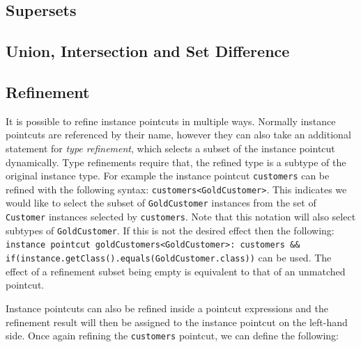 \documentclass{llncs}
\begin{document}
\subsection{Supersets}


\subsection{Union, Intersection and Set Difference}


\subsection{Refinement} 
It is possible to refine instance pointcuts in multiple ways. Normally instance pointcuts are referenced by their name, however they can also take an additional statement for \emph{type refinement}, which selects a subset of the instance pointcut dynamically. Type refinements require that, the refined type is a subtype of the original instance type. For example the instance pointcut \texttt{customers} can be refined with the following syntax: \lstinline!customers<GoldCustomer>!. 
This indicates we would like to select the subset of \texttt{GoldCustomer} instances from the set of \texttt{Customer} instances selected by \texttt{customers}. 
Note that this notation will also select subtypes of \texttt{GoldCustomer}. 
If this is not the desired effect then the following: \lstinline!instance pointcut goldCustomers<GoldCustomer>: customers && if(instance.getClass().equals(GoldCustomer.class))! can be used. 
The effect of a refinement subset being empty is equivalent to that of an unmatched pointcut. 

Instance pointcuts can also be refined inside a pointcut expressions and the refinement result will then be assigned to the instance pointcut on the left-hand side. Once again refining the \texttt{customers} pointcut, we can define the following:
\end{document}
